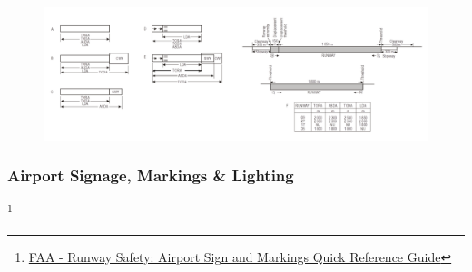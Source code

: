 \documentclass[12pt]{article}
\begin{document}
\begin{itemize}
\begin{itemize}
				\end{itemize}
				\begin{figure}[h]
					\centering
					\includegraphics[width=\linewidth]{Figures/Runway Lengths.png}
				\end{figure}
			\end{itemize}
			\newpage
		\subsubsection{Airport Signage, Markings \& Lighting}	\footnote{\href{https://www.faa.gov/airports/runway_safety/publications/media/QuickReferenceGuideProof8.pdf}{FAA - Runway Safety: Airport Sign and Markings Quick Reference Guide}}
			\begin{figure}[h]
				\centering
				
			\end{figure}
			\newpage
\end{document}
